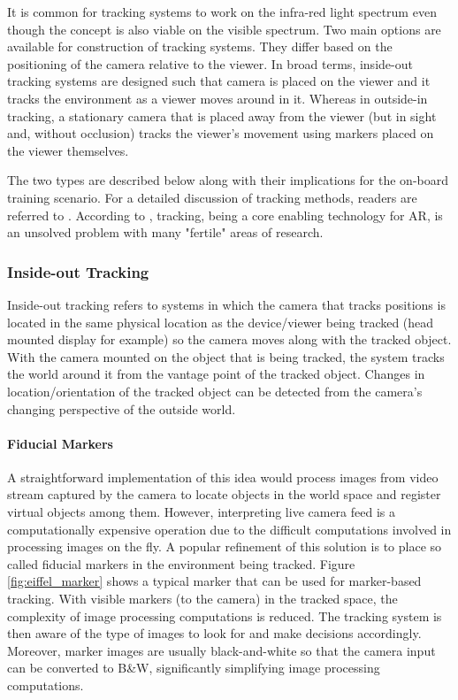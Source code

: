 It is common for tracking systems to work on the infra-red light spectrum even though the concept is also viable on the visible spectrum. Two main options are available for construction of tracking systems. They differ based on the positioning of the camera relative to the viewer. In broad terms, inside-out tracking systems are designed such that camera is placed on the viewer and it tracks the environment as a viewer moves around in it. Whereas in outside-in tracking, a stationary camera that is placed away from the viewer (but in sight and, without occlusion) tracks the viewer’s movement using markers placed on the viewer themselves. 

The two types are described below along with their implications for the on-board training scenario. For a detailed discussion of tracking methods, readers are referred to \cite{zhou2008trends}. According to \cite{zhou2008trends}, tracking, being a core enabling technology for AR, is an unsolved problem with many "fertile" areas of research.

\subsubsection{Inside-out Tracking}
Inside-out tracking refers to systems in which the camera that tracks positions is located in the same physical location as the device/viewer being tracked (head mounted display for example) so the camera moves along with the tracked object. With the camera mounted on the object that is being tracked, the system tracks the world around it from the vantage point of the tracked object. Changes in location/orientation of the tracked object can be detected from the camera’s changing perspective of the outside world.

\paragraph{Fiducial Markers}
A straightforward implementation of this idea would process images from video stream captured by the camera to locate objects in the world space and register virtual objects among them. However, interpreting live camera feed is a computationally expensive operation due to the difficult computations involved in processing images on the fly. A popular refinement of this solution is to place so called fiducial markers in the environment being tracked. Figure \ref{fig:eiffel_marker} shows a typical marker that can be used for marker-based tracking. With visible markers (to the camera) in the tracked space, the complexity of image processing computations is reduced. The tracking system is then aware of the type of images to look for and make decisions accordingly. Moreover, marker images are usually black-and-white so that the camera input can be converted to B\&W, significantly simplifying image processing computations.

